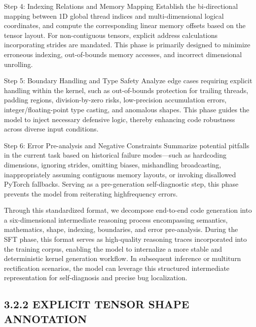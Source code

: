 \documentclass[
  10
]{article}
\begin{document}
Step 4: Indexing Relations and Memory Mapping Establish the
bi-directional mapping between 1D global thread indices and
multi-dimensional logical coordinates, and compute the corresponding
linear memory offsets based on the tensor layout. For non-contiguous
tensors, explicit address calculations incorporating strides are
mandated. This phase is primarily designed to minimize erroneous
indexing, out-of-bounds memory accesses, and incorrect dimensional
unrolling.

Step 5: Boundary Handling and Type Safety Analyze edge cases requiring
explicit handling within the kernel, such as out-of-bounds protection
for trailing threads, padding regions, division-by-zero risks,
low-precision accumulation errors, integer/floating-point type casting,
and anomalous shapes. This phase guides the model to inject necessary
defensive logic, thereby enhancing code robustness across diverse input
conditions.

Step 6: Error Pre-analysis and Negative Constraints Summarize potential
pitfalls in the current task based on historical failure modes---such as
hardcoding dimensions, ignoring strides, omitting biases, mishandling
broadcasting, inappropriately assuming contiguous memory layouts, or
invoking disallowed PyTorch fallbacks. Serving as a pre-generation
self-diagnostic step, this phase prevents the model from reiterating
highfrequency errors.

Through this standardized format, we decompose end-to-end code
generation into a six-dimensional intermediate reasoning process
encompassing semantics, mathematics, shape, indexing, boundaries, and
error pre-analysis. During the SFT phase, this format serves as
high-quality reasoning traces incorporated into the training corpus,
enabling the model to internalize a more stable and deterministic kernel
generation workflow. In subsequent inference or multiturn rectification
scenarios, the model can leverage this structured intermediate
representation for self-diagnosis and precise bug localization.

\subsection{3.2.2 EXPLICIT TENSOR SHAPE
ANNOTATION}\label{explicit-tensor-shape-annotation}
\end{document}

